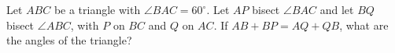 Let $ABC$ be a triangle with $\angle BAC = 60^{\circ}$. Let $AP$ bisect $\angle BAC$ and let $BQ$ bisect  $\angle ABC$,  with $P$ on $BC$ and $Q$ on $AC$. If $AB + BP = AQ + QB$,  what are the angles of the triangle?